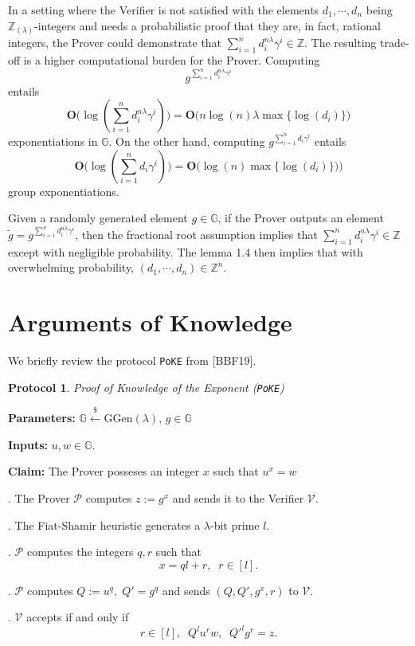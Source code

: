 \documentclass[11pt, lettersize, notitlepage, leqno, footskip=0.6cm]{article}
\newcommand{\bz}{\mathbb Z}
\newcommand{\slim}{\sum\limits}
\newcommand{\wti}{\widetilde}
\newcommand{\mc}{\mathcal}
\newcommand{\mb}{\mathbb}
\newcommand{\mbf}{\mathbf}
\newcommand{\mr}{\mathrm}
\newcommand{\lam}{\lambda}
\newcommand{\lamb}{\lambda}
\newcommand{\bzlam}{\bz_{(\lam)}}
\newcommand{\vs}{\vspace{-0.15cm}}
\newcommand{\op}{overwhelming probability}
\newtheorem{Prot}[Thm]{Protocol}
\numberwithin{equation}{section}
\begin{document}
In a setting where the Verifier is not satisfied with the elements $d_1,\cdots, d_n$ being $\bzlam$-integers and needs a probabilistic proof that they are, in fact, rational integers, the Prover could demonstrate that $\sum\limits_{i=1}^n d_i^{n\lam}\gamma^i\in \bz$. The resulting trade-off is a higher computational burden for the Prover. Computing \vs $$g^{\slim_{i=1}^n d_i^{n\lam} \gamma^i}$$ entails \vs $$\mbf{O}\big(\log(\slim_{i=1}^n d_i^{n\lam} \gamma^i)\big) = \mbf{O}\big(n\log(n)\lam\max\{\log(d_i)\}\big) $$ exponentiations in $\mb{G}$. On the other hand, computing $g^{\slim_{i=1}^n d_i\gamma^i}$ entails \vs $$\mbf{O}\big(\log(\slim_{i=1}^n d_i\gamma^i)\big) = \mbf{O}\big(\log(n)\max\{\log(d_i)\}) \big)$$ group exponentiations.



Given a randomly generated element $g\in \mb{G}$, if the Prover outputs an element $\wti{g} = g^{\sum\limits_{i=1}^n d_i^{n\lam}\gamma^i}$, then the fractional root assumption implies that $\sum\limits_{i=1}^n d_i^{n\lam}\gamma^i\in \bz$ except with negligible probability. The lemma 1.4 then implies that with \op, $(d_1,\cdots,d_n)\in \bz^n$.
\bigskip



\section{\fontsize{12}{12}\selectfont Arguments of Knowledge  }

\noindent We briefly review the protocol \verb|PoKE| from [BBF19]. 

\begin{Prot} \normalfont \textit{Proof of Knowledge of the Exponent} (\verb|PoKE|) \end{Prot} \vspace{-0.3cm}

\noindent \textbf{Parameters:} $\mb{G}\xleftarrow{\$} \mr{GGen}(\lamb)$,\; $g\in \mb{G}$

\noindent \textbf{Inputs:} $u, w \in \mb{G}$.

\noindent \textbf{Claim:} The Prover posseses an integer $x$ such that $u^x = w$

\begin{prf1} . The Prover $\mc{P}$ computes $z:= g^x$ and sends it to the Verifier $\mc{V}$.

. The Fiat-Shamir heuristic generates a $\lamb$-bit prime $l$.

. $\mc{P}$ computes the integers $q, r$ such that  \vspace{-0.15cm}$$x = ql+r,\;\; r\in [l].$$

. $\mc{P}$ computes $Q:= u^q,\; Q' = g^q$ and sends $(Q, Q', g^x, r)$ to $\mc{V}$.

. $\mc{V}$ accepts if and only if \vspace{-0.15cm}$$r\in [l],\;\; Q^lu^r w,\;\; Q'^lg^r = z.$$\end{prf1}
\end{document}
